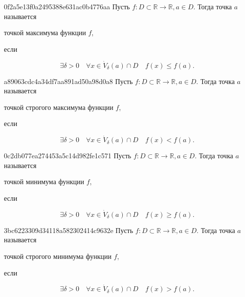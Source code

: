 \begin{note}{0f2a5e13f0a2495388e631ac0b4776aa}
    Пусть \( f : D \subset \mathbb R \to \mathbb R, a \in D \). Тогда точка \( a \) называется \begin{icloze}{2}точкой максимума функции \( f \),\end{icloze} если
    \begin{icloze}{1}\[
                         \exists \delta > 0 \quad \forall x \in \dot V_{\delta} (a) \cap D \quad f(x) \leqslant f(a).
                     \]\end{icloze}
\end{note}

\begin{note}{a89063cdc4a34df7aa891ad50a98d0a8}
    Пусть \( f : D \subset \mathbb R \to \mathbb R, a \in D \). Тогда точка \( a \) называется \begin{icloze}{2}точкой строгого максимума функции \( f \),\end{icloze} если
    \begin{icloze}{1}\[
        \exists \delta > 0 \quad \forall x \in \dot V_{\delta} (a) \cap D \quad f(x) < f(a).
    \]\end{icloze}
\end{note}

\begin{note}{0c2db077ea274453a5c14d982fe1c571}
    Пусть \( f : D \subset \mathbb R \to \mathbb R, a \in D \). Тогда точка \( a \) называется \begin{icloze}{2}точкой минимума функции \( f \),\end{icloze} если
    \begin{icloze}{1}\[
        \exists \delta > 0 \quad \forall x \in \dot V_{\delta} (a) \cap D \quad f(x) \geqslant f(a).
    \]\end{icloze}
\end{note}

\begin{note}{3bc6223309d34118a582302414c9632e}
    Пусть \( f : D \subset \mathbb R \to \mathbb R, a \in D \). Тогда точка \( a \) называется \begin{icloze}{2}точкой строгого минимума функции \( f \),\end{icloze} если
    \begin{icloze}{1}\[
        \exists \delta > 0 \quad \forall x \in \dot V_{\delta} (a) \cap D \quad f(x) > f(a).
    \]\end{icloze}
\end{note}

